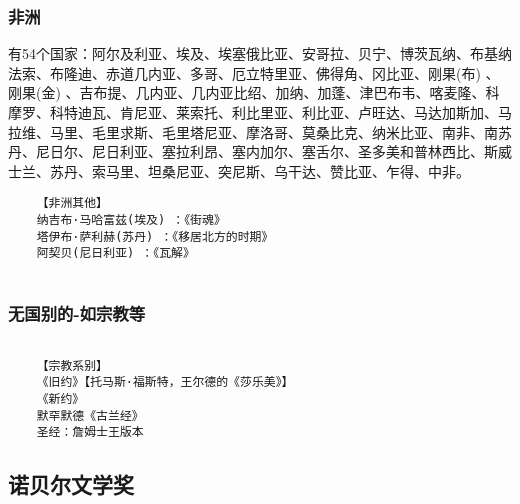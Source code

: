 \documentclass[UTF8]{../RepresentationUniverse}
\begin{document}
\subsubsection{非洲}
有54个国家：阿尔及利亚、埃及、埃塞俄比亚、安哥拉、贝宁、博茨瓦纳、布基纳法索、布隆迪、赤道几内亚、多哥、厄立特里亚、佛得角、冈比亚、刚果(布) 、刚果(金) 、吉布提、几内亚、几内亚比绍、加纳、加蓬、津巴布韦、喀麦隆、科摩罗、科特迪瓦、肯尼亚、莱索托、利比里亚、利比亚、卢旺达、马达加斯加、马拉维、马里、毛里求斯、毛里塔尼亚、摩洛哥、莫桑比克、纳米比亚、南非、南苏丹、尼日尔、尼日利亚、塞拉利昂、塞内加尔、塞舌尔、圣多美和普林西比、斯威士兰、苏丹、索马里、坦桑尼亚、突尼斯、乌干达、赞比亚、乍得、中非。
\begin{lstlisting}
    【非洲其他】
    纳吉布·马哈富兹(埃及) ：《街魂》
    塔伊布·萨利赫(苏丹) ：《移居北方的时期》
    阿契贝(尼日利亚) ：《瓦解》
    
\end{lstlisting}


\subsubsection{无国别的-如宗教等}
\begin{lstlisting}

    【宗教系别】
    《旧约》【托马斯·福斯特，王尔德的《莎乐美》】
    《新约》
    默罕默德《古兰经》
    圣经：詹姆士王版本
\end{lstlisting}











\subsection{诺贝尔文学奖}
\end{document}
